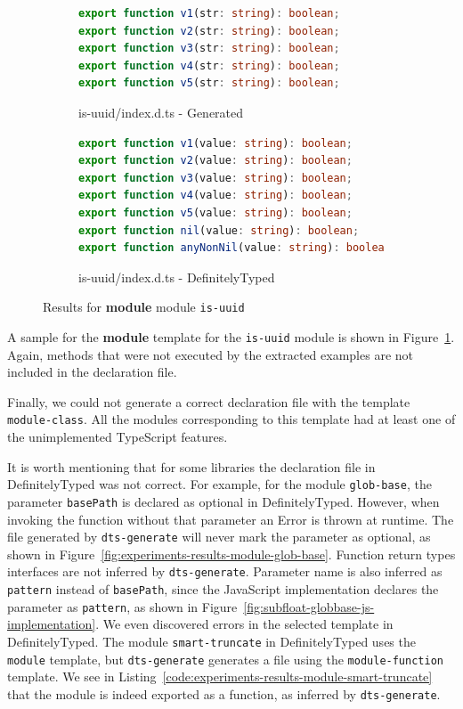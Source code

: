 \documentclass[a4paper,english,cleveref, autoref]{lipics-v2019}
\newcommand{\figref}[1]{Figure~\ref{#1}}
\newcommand{\coderef}[1]{Listing~\ref{#1}}
\begin{document}
\begin{figure}[tp]
    \centering
    \begin{subfigure}{0.48\linewidth}
      \begin{lstlisting}[language=TypeScript]
export function v1(str: string): boolean;
export function v2(str: string): boolean;
export function v3(str: string): boolean;
export function v4(str: string): boolean;
export function v5(str: string): boolean;
      \end{lstlisting}
      \caption{is-uuid/index.d.ts - Generated}
    \end{subfigure}
    \hfill
    \begin{subfigure}{0.48\linewidth}
      \begin{lstlisting}[language=TypeScript]
export function v1(value: string): boolean;
export function v2(value: string): boolean;
export function v3(value: string): boolean;
export function v4(value: string): boolean;
export function v5(value: string): boolean;
export function nil(value: string): boolean;
export function anyNonNil(value: string): boolean;
      \end{lstlisting}
      \caption{is-uuid/index.d.ts - DefinitelyTyped}
    \end{subfigure}

    \caption{Results for \textbf{module}  module \texttt{is-uuid}}
    \label{fig:experiments-results-module-is-uuid}
\end{figure}

A sample for the \textbf{module} template
for the \texttt{is-uuid} module is shown in
\figref{fig:experiments-results-module-is-uuid}.
Again, methods that were not executed by the extracted examples are
not included in the declaration file. 

Finally, we could not generate a correct declaration file with the template \texttt{module-class}. All the modules corresponding to this template had at least one of the unimplemented TypeScript features.

It is worth mentioning that for some libraries the declaration file in
DefinitelyTyped was not correct. For example, for the module
\texttt{glob-base}, the parameter \texttt{basePath} is declared as optional in DefinitelyTyped. However, when invoking the function without that parameter an Error is thrown at runtime. The file generated by \texttt{dts-generate} will never mark the parameter as optional, as shown in \figref{fig:experiments-results-module-glob-base}. Function return types interfaces are not inferred by \texttt{dts-generate}. Parameter name is also inferred as \texttt{pattern} instead of \texttt{basePath}, since the JavaScript implementation declares the parameter as \texttt{pattern}, as shown in \figref{fig:subfloat-globbase-js-implementation}. We even discovered errors in the selected template in DefinitelyTyped. The module \texttt{smart-truncate} in DefinitelyTyped uses the \texttt{module} template, but \texttt{dts-generate} generates a file using the \texttt{module-function} template. We see in \coderef{code:experiments-results-module-smart-truncate} that the module is indeed exported as a function, as inferred by \texttt{dts-generate}.
\end{document}
